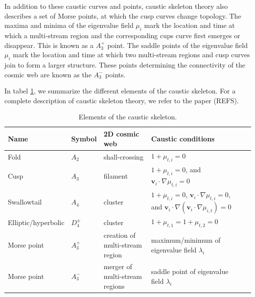 \documentclass[a4paper, 11pt]{article}
\begin{document}
In addition to these caustic curves and points, caustic skeleton theory also describes a set of Morse points, at which the cusp curves change topology. The maxima and minima of the eigenvalue field $\mu_i$ mark the location and time at which a multi-stream region and the corresponding cups curve first emerges or disappear. This is known as a  $A_3^+$ point. The saddle points of the eigenvalue field $\mu_i$ mark the location and time at which two multi-stream regions and cusp curves join to form a larger structure. These points determining the connectivity of the cosmic web are known as the  $A_3^-$ points. 

In tabel \ref{table:caustics}, we summarize the different elements of the caustic skeleton. For a complete description of caustic skeleton theory, we refer to the paper (REFS).

\begin{table}
\centering
{\scriptsize
\begin{tabular}{ |l | l | l | l | l|}
\hline
Name & Symbol & 2D cosmic web & Caustic conditions\\
\hline
Fold & $A_2$ & shall-crossing & $1+ \mu_{t,i} = 0$ \\
\hline
Cusp & $A_3$ & filament & $1+ \mu_{t,i} = 0$, and $\bm{v}_i \cdot \nabla \mu_{t,i} = 0$\\
\hline
Swallowtail &$A_4$ &  cluster & $1+ \mu_{t,i} = 0$, $\bm{v}_i \cdot \nabla \mu_{t,i} = 0$, and $\bm{v}_i \cdot \nabla(\bm{v}_i \cdot \nabla \mu_{i,t}) = 0$\\
\hline
Elliptic/hyperbolic & $D_4^{\pm}$ & cluster & $1+ \mu_{t,1} = 1+ \mu_{t,2} = 0$\\
\hline
Morse point & $A_3^+$ & creation of multi-stream region & maximum/minimum of eigenvalue field $\lambda_i$\\
\hline
Morse point & $A_3^-$ & merger of multi-stream regions & saddle point of eigenvalue field $\lambda_i$\\
\hline
\end{tabular}
}
\caption{Elements of the caustic skeleton.}
\label{table:caustics}
\end{table}
\end{document}
